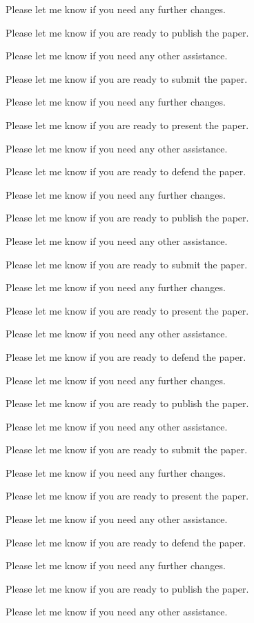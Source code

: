 Please let me know if you need any further changes. 

Please let me know if you are ready to publish the paper. 

Please let me know if you need any other assistance. 

Please let me know if you are ready to submit the paper. 

Please let me know if you need any further changes. 

Please let me know if you are ready to present the paper. 

Please let me know if you need any other assistance. 

Please let me know if you are ready to defend the paper. 

Please let me know if you need any further changes. 

Please let me know if you are ready to publish the paper. 

Please let me know if you need any other assistance. 

Please let me know if you are ready to submit the paper. 

Please let me know if you need any further changes. 

Please let me know if you are ready to present the paper. 

Please let me know if you need any other assistance. 

Please let me know if you are ready to defend the paper. 

Please let me know if you need any further changes. 

Please let me know if you are ready to publish the paper. 

Please let me know if you need any other assistance. 

Please let me know if you are ready to submit the paper. 

Please let me know if you need any further changes. 

Please let me know if you are ready to present the paper. 

Please let me know if you need any other assistance. 

Please let me know if you are ready to defend the paper. 

Please let me know if you need any further changes. 

Please let me know if you are ready to publish the paper. 

Please let me know if you need any other assistance. 

